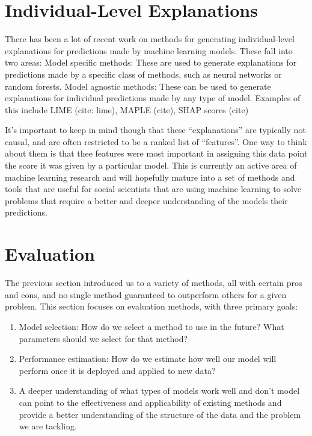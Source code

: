 \documentclass[]{krantz}
\begin{document}
\section{Individual-Level
Explanations}\label{individual-level-explanations}

There has been a lot of recent work on methods for generating
individual-level explanations for predictions made by machine learning
models. These fall into two areas: Model specific methods: These are
used to generate explanations for predictions made by a specific class
of methods, such as neural networks or random forests. Model agnostic
methods: These can be used to generate explanations for individual
predictions made by any type of model. Examples of this include LIME
(cite: lime), MAPLE (cite), SHAP scores (cite)

It's important to keep in mind though that these ``explanations'' are
typically not causal, and are often restricted to be a ranked list of
``features''. One way to think about them is that thee features were
most important in assigning this data point the score it was given by a
particular model. This is currently an active area of machine learning
research and will hopefully mature into a set of methods and tools that
are useful for social scientists that are using machine learning to
solve problems that require a better and deeper understanding of the
models their predictions.

\section{Evaluation}\label{evaluation}

The previous section introduced us to a variety of methods, all with
certain pros and cons, and no single method guaranteed to outperform
others for a given problem. This section focuses on evaluation methods,
with three primary goals:

\begin{enumerate}
\def\labelenumi{\arabic{enumi}.}
\item
  Model selection: How do we select a method to use in the future? What
  parameters should we select for that method?
\item
  Performance estimation: How do we estimate how well our model will
  perform once it is deployed and applied to new data?
\item
  A deeper understanding of what types of models work well and don't
  model can point to the effectiveness and applicability of existing
  methods and provide a better understanding of the structure of the
  data and the problem we are tackling.
\end{enumerate}
\end{document}
